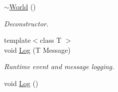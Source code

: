 \begin{DoxyCompactItemize}
\hyperlink{classphys_1_1World_a8b2c74c7e5d5ce3c46a814e183a7aff1}{$\sim$World} ()
\begin{DoxyCompactList}\small\item\em Deconstructor. \item\end{DoxyCompactList}\item 
{\footnotesize template$<$class T $>$ }\\void \hyperlink{classphys_1_1World_a05267a20e8d5518771d0848190b33d60}{Log} (T Message)
\begin{DoxyCompactList}\small\item\em Runtime event and message logging. \item\end{DoxyCompactList}\item 
\hypertarget{classphys_1_1World_a7dbf83226aaa109a09efab00ae682761}{
void \hyperlink{classphys_1_1World_a7dbf83226aaa109a09efab00ae682761}{Log} ()}
\label{da/ddf/classphys_1_1World_a7dbf83226aaa109a09efab00ae682761}


\end{DoxyCompactItemize}

